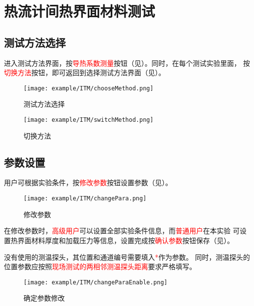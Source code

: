 \section{热流计间热界面材料测试}
\subsection{测试方法选择}
进入测试方法界面，按\textcolor{red}{导热系数测量}按钮（见）。同时，在每个测试实验里面，
按\textcolor{red}{切换方法}按钮，即可返回到选择测试方法界面（见）。
\begin{figure}[H]
	\centering
	\texttt{[image: example/ITM/chooseMethod.png]}
	\caption{ 测试方法选择 \label{fig:exmp_itm_chooseMethod}}
\end{figure}

\begin{figure}[H]
	\centering
	\texttt{[image: example/ITM/switchMethod.png]}
	\caption{ 切换方法 \label{fig:exmp_itm_switchMethod}}
\end{figure}

\subsection{参数设置}
用户可根据实验条件，按\textcolor{red}{修改参数}按钮设置参数（见）。
\begin{figure}[H]
	\centering
	\texttt{[image: example/ITM/changePara.png]}
	\caption{ 修改参数 \label{fig:exmp_itm_changePara}}
\end{figure}
在修改参数时，\textcolor{red}{高级用户}可以设置全部实验条件信息，而\textcolor{red}{普通用户}在本实验
可设置热界面材料厚度和加载压力等信息，设置完成按\textcolor{red}{确认参数}按钮保存（见）。
\begin{note}
没有使用的测温探头，其位置和通道编号需要填入\textcolor{red}{*}作为参数。
同时，测温探头的位置参数应按照\textcolor{red}{现场测试的两相邻测温探头距离}要求严格填写。
\end{note}
\begin{figure}[H]
	\centering
	\texttt{[image: example/ITM/changeParaEnable.png]}
	\caption{ 确定参数修改 \label{fig:exmp_itm_changeParaEnable}}
\end{figure}

